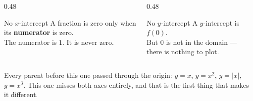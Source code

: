 \documentclass[aspectratio=169, 11pt]{beamer}
\begin{document}
\begin{frame}[t, plain]
  \begin{columns}[T]
    \begin{column}{0.48\textwidth}
      \begin{block}{No $x$-intercept}
        A fraction is zero only when its \textbf{numerator} is zero. \\[3pt]
        The numerator is $1$. It is never zero.
      \end{block}
    \end{column}
    \begin{column}{0.48\textwidth}
      \begin{block}{No $y$-intercept}
        A $y$-intercept is $f(0)$. \\[3pt]
        But $0$ is not in the domain --- there is nothing to plot.
      \end{block}
    \end{column}
  \end{columns}
  \vspace{8pt}
  {\footnotesize Every parent before this one passed through the origin: $y=x$, $y=x^2$, $y=|x|$,
  $y=x^3$. This one misses both axes entirely, and that is the first thing that makes it different.}
\end{frame}
\end{document}
